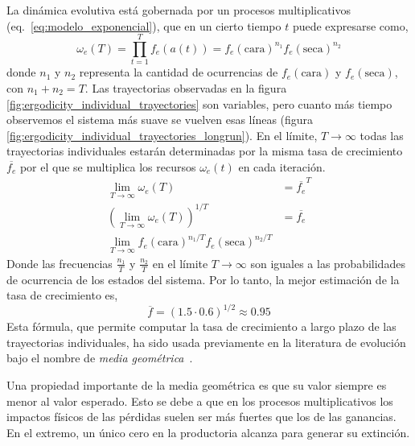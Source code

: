 \documentclass[a4paper,10pt]{article}
\begin{document}

La dinámica evolutiva está gobernada por un procesos multiplicativos (eq.~\ref{eq:modelo_exponencial}), que en un cierto tiempo $t$ puede expresarse como,
%
\begin{equation}
\omega_e(T) = \prod^T_{t=1} f_e(a(t)) = f_e(\text{cara})^{n_1} f_e(\text{seca})^{n_2}
\end{equation}
%
donde $n_1$ y $n_2$ representa la cantidad de ocurrencias de $f_e(\text{cara})$ y $f_e(\text{seca})$, con $n_1 + n_2 = T$.
Las trayectorias observadas en la figura \ref{fig:ergodicity_individual_trayectories} son variables, pero cuanto más tiempo observemos el sistema más suave se vuelven esas líneas (figura \ref{fig:ergodicity_individual_trayectories_longrun}).
En el límite, $T \rightarrow \infty$ todas las trayectorias individuales estarán determinadas por la misma tasa de crecimiento $\overline{f_e}$ por el que se multiplica los recursos $\omega_e(t)$ en cada iteración.
\begin{equation} \label{eq:geometric_mean}
\begin{split}
\lim_{T \rightarrow \infty} \omega_e(T) & = \overline{f_e}^T \\
\left( \lim_{T \rightarrow \infty} \omega_e(T) \right)^{1/T} & =  \overline{f_e} \\
\lim_{T \rightarrow \infty} f_e(\text{cara})^{n_1/T} f_e(\text{seca})^{n_2/T} & 
 \end{split}
\end{equation}
Donde las frecuencias $\frac{n_1}{T}$ y $\frac{n_2}{T}$ en el límite $T \rightarrow \infty$ son iguales a las probabilidades de ocurrencia de los estados del sistema.
Por lo tanto, la mejor estimación de la tasa de crecimiento es,
\begin{equation}
\overline{f} = (1.5 \cdot 0.6)^{1/2} \approx 0.95
\end{equation}
%
Esta fórmula, que permite computar la tasa de crecimiento a largo plazo de las trayectorias individuales, ha sido usada previamente en la literatura de evolución bajo el nombre de \emph{media geométrica}~\cite{dempster1955-geometricMean}.


Una propiedad importante de la media geométrica es que su valor siempre es menor al valor esperado.
Esto se debe a que en los procesos multiplicativos los impactos físicos de las pérdidas suelen ser más fuertes que los de las ganancias.
En el extremo, un único cero en la productoria alcanza para generar su extinción.
\end{document}
